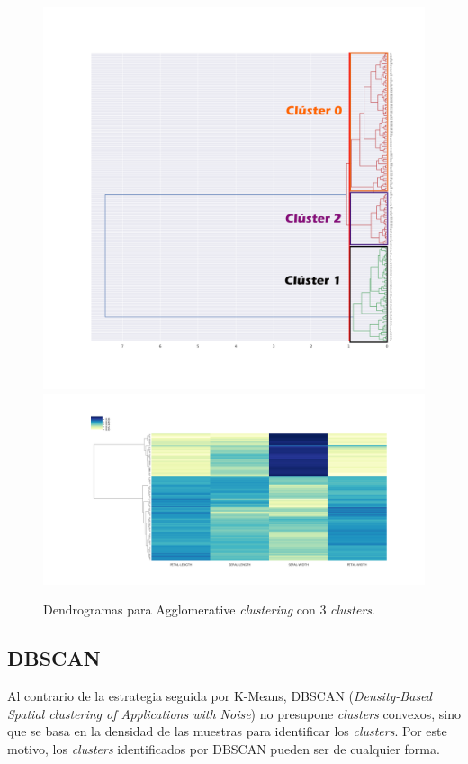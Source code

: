 \documentclass[a4paper, 20pt]{article}
\begin{document}
\begin{figure}[h]
\centering
\includegraphics[scale=0.35]{dani/dendrogramcolor.png}
\includegraphics[scale=0.35]{dani/dendscatAggClusterIRIS.png}
\caption{Dendrogramas para Agglomerative \textit{clustering} con 3 \textit{clusters}.}
\label{dac}
\end{figure}

\clearpage

\subsection{DBSCAN}

Al contrario de la estrategia seguida por K-Means, DBSCAN (\textit{Density-Based Spatial \textit{clustering} of Applications with Noise}) no presupone \textit{clusters} convexos, sino que se basa en la densidad de las muestras para identificar los \textit{clusters}. Por este motivo, los \textit{clusters} identificados por DBSCAN pueden ser de cualquier forma.\\
\end{document}
